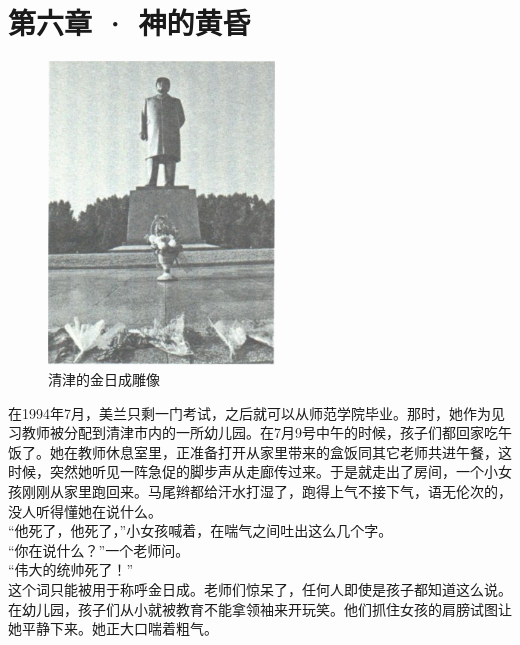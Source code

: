 \fancyhead[RO]{\thepage}
\fancyhead[LE]{\thepage}
\fancyfoot[LE,RO]{}
\fancyfoot[LO,CE]{}
\fancyfoot[CO,RE]{}
\chapter*{第六章 · 神的黄昏}
\begin{figure}[!htbp]
	\centering
	\includegraphics[width=6cm]{./Chapters/Images/06.jpg}
	\caption*{清津的金日成雕像}
\end{figure}


在1994年7月，美兰只剩一门考试，之后就可以从师范学院毕业。那时，她作为见习教师被分配到清津市内的一所幼儿园。在7月9号中午的时候，孩子们都回家吃午饭了。她在教师休息室里，正准备打开从家里带来的盒饭同其它老师共进午餐，这时候，突然她听见一阵急促的脚步声从走廊传过来。于是就走出了房间，一个小女孩刚刚从家里跑回来。马尾辫都给汗水打湿了，跑得上气不接下气，语无伦次的，没人听得懂她在说什么。\\

“他死了，他死了，”小女孩喊着，在喘气之间吐出这么几个字。\\

“你在说什么？”一个老师问。\\

“伟大的统帅死了！”\\

这个词只能被用于称呼金日成。老师们惊呆了，任何人即使是孩子都知道这么说。在幼儿园，孩子们从小就被教育不能拿领袖来开玩笑。他们抓住女孩的肩膀试图让她平静下来。她正大口喘着粗气。\\

